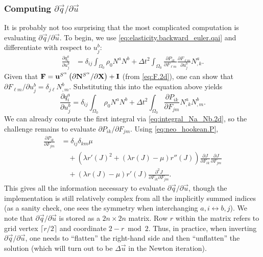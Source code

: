 \subsubsection{Computing $\partial\vec{q}/\partial\vec{u}$}

It is probably not too surprising that the most complicated computation is evaluating $\partial\vec{q}/\partial\vec{u}$. To begin, we use \eqref{eq:elasticity.backward_euler.qai} and differentiate with respect to $u^b_j$:
\begin{equation*}
\begin{split}
\frac{\partial q^a_i}{\partial u^b_j}
  & = \delta_{ij} \int_{\Omega_0} \rho_0 N^a N^b
    + \Delta t^2 \int_{\Omega_0} \frac{\partial P_{ik}}{\partial F_{\ell m}} \frac{\partial F_{\ell m}}{\partial u^b_j} N^a_{,k}.
\end{split}
\end{equation*}
Given that $\mathbf{F} = \mathbf{u}^{S^{\alpha}} \left( \partial \mathbf{N}^{S^{\alpha}} / \partial \mathbf{X} \right) + \mathbf{I}$ (from \eqref{eq:F.2d}), one can show that $\partial F_{\ell m} / \partial u^b_j = \delta_{j \ell} N^b_{,m}$. Substituting this into the equation above yields
\begin{equation}\label{eq:elasticity.backward_euler.dqaidubj}
\frac{\partial q^a_i}{\partial u^b_j}
  = \delta_{ij} \int_{\Omega_0} \rho_0 N^a N^b
  + \Delta t^2 \int_{\Omega_0} \frac{\partial P_{ik}}{\partial F_{jm}} N^a_{,k} N^b_{,m}.
\end{equation}
We can already compute the first integral via \eqref{eq:integral_Na_Nb.2d}, so the challenge remains to evaluate $\partial P_{ik}/\partial F_{jm}$. Using \eqref{eq:neo_hookean.P},
\begin{equation*}
\begin{split}
\frac{\partial P_{ik}}{\partial F_{jm}}
  & = \delta_{ij} \delta_{km} \mu \\
  & \quad {} + \left( \lambda r'(J)^2 + \left( \lambda r(J) - \mu \right) r''(J) \right) \frac{\partial J}{\partial F_{ik}} \frac{\partial J}{\partial F_{jm}} \\
  & \quad {} + \left( \lambda r(J) - \mu \right) r'(J) \frac{\partial^2 J}{\partial F_{ik} \partial F_{jm}}.
\end{split}
\end{equation*}
This gives all the information necessary to evaluate $\partial\vec{q}/\partial\vec{u}$, though the implementation is still relatively complex from all the implicitly summed indices (as a sanity check, one sees the symmetry when interchanging $a,i \leftrightarrow b,j$). We note that $\partial\vec{q}/\partial\vec{u}$ is stored as a $2n \times 2n$ matrix. Row $r$ within the matrix refers to grid vertex $\lceil r/2 \rceil$ and coordinate $2 - r \bmod 2$. Thus, in practice, when inverting $\partial\vec{q}/\partial\vec{u}$, one needs to ``flatten'' the right-hand side and then ``unflatten'' the solution (which will turn out to be $\Delta\vec{u}$ in the Newton iteration).
